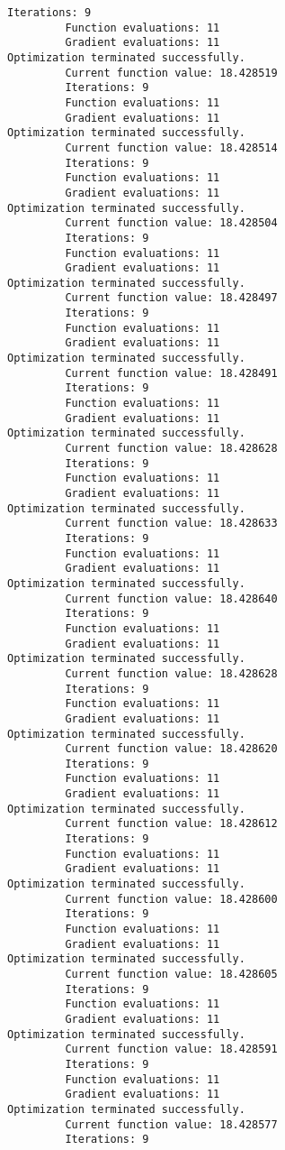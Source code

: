 \documentclass[11pt]{article}
\begin{document}
\begin{Verbatim}[commandchars=\\\{\}]
         Iterations: 9
         Function evaluations: 11
         Gradient evaluations: 11
Optimization terminated successfully.
         Current function value: 18.428519
         Iterations: 9
         Function evaluations: 11
         Gradient evaluations: 11
Optimization terminated successfully.
         Current function value: 18.428514
         Iterations: 9
         Function evaluations: 11
         Gradient evaluations: 11
Optimization terminated successfully.
         Current function value: 18.428504
         Iterations: 9
         Function evaluations: 11
         Gradient evaluations: 11
Optimization terminated successfully.
         Current function value: 18.428497
         Iterations: 9
         Function evaluations: 11
         Gradient evaluations: 11
Optimization terminated successfully.
         Current function value: 18.428491
         Iterations: 9
         Function evaluations: 11
         Gradient evaluations: 11
Optimization terminated successfully.
         Current function value: 18.428628
         Iterations: 9
         Function evaluations: 11
         Gradient evaluations: 11
Optimization terminated successfully.
         Current function value: 18.428633
         Iterations: 9
         Function evaluations: 11
         Gradient evaluations: 11
Optimization terminated successfully.
         Current function value: 18.428640
         Iterations: 9
         Function evaluations: 11
         Gradient evaluations: 11
Optimization terminated successfully.
         Current function value: 18.428628
         Iterations: 9
         Function evaluations: 11
         Gradient evaluations: 11
Optimization terminated successfully.
         Current function value: 18.428620
         Iterations: 9
         Function evaluations: 11
         Gradient evaluations: 11
Optimization terminated successfully.
         Current function value: 18.428612
         Iterations: 9
         Function evaluations: 11
         Gradient evaluations: 11
Optimization terminated successfully.
         Current function value: 18.428600
         Iterations: 9
         Function evaluations: 11
         Gradient evaluations: 11
Optimization terminated successfully.
         Current function value: 18.428605
         Iterations: 9
         Function evaluations: 11
         Gradient evaluations: 11
Optimization terminated successfully.
         Current function value: 18.428591
         Iterations: 9
         Function evaluations: 11
         Gradient evaluations: 11
Optimization terminated successfully.
         Current function value: 18.428577
         Iterations: 9

\end{Verbatim}
\end{document}
